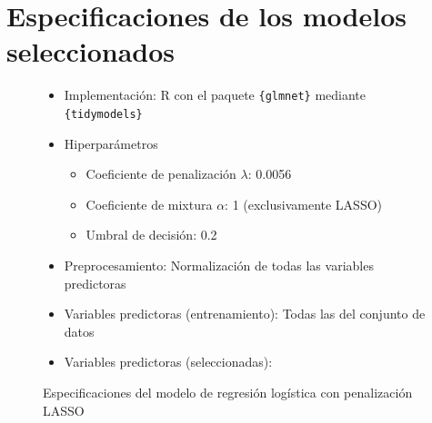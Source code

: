\documentclass[a4paper, titlepage]{article}
\begin{document}
\printbibliography
\clearpage

\appendix

\section{Especificaciones de los modelos seleccionados}\label{sec:anexo1}

\begin{figure}[h]
  \renewcommand{\figurename}{Cuadro}
\begin{framed}
\begin{itemize}
  \item Implementación: R con el paquete \verb|{glmnet}| mediante \verb|{tidymodels}|
  \item Hiperparámetros
  \begin{itemize}
    \item Coeficiente de penalización $\lambda$: 0.0056
    \item Coeficiente de mixtura $\alpha$: 1 (exclusivamente LASSO)
    \item Umbral de decisión: 0.2
  \end{itemize}
  \item Preprocesamiento: Normalización de todas las variables predictoras
  \item Variables predictoras (entrenamiento): Todas las del conjunto de datos
  \item Variables predictoras (seleccionadas): 
\end{itemize}
  \centering
  
\end{framed}
\caption{Especificaciones del modelo de regresión logística con penalización LASSO}
\label{fig:lassoespec}
\end{figure}
\end{document}
